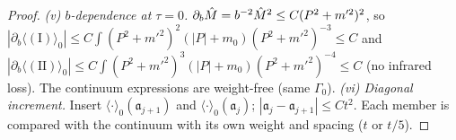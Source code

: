 \begin{proof}
\emph{(v) $b$-dependence at $\tau=0$.} $\partial_b\hat M=b^{-2}\hat M^2\le C(P^2+m'^2)^2$, so $|\partial_b\langle(\mathrm I)\rangle_0|\le C\int(P^2+m'^2)^2(|P|+m_0)(P^2+m'^2)^{-3}\le C$ and $|\partial_b\langle(\mathrm{II})\rangle_0|\le C\int(P^2+m'^2)^3(|P|+m_0)(P^2+m'^2)^{-4}\le C$ (no infrared loss). The continuum expressions are weight-free (same $\Gamma_0$).
\emph{(vi) Diagonal increment.} Insert $\langle\cdot\rangle_0(\mathfrak a_{j+1})$ and $\langle\cdot\rangle_0(\mathfrak a_j)$; $|\mathfrak a_j-\mathfrak a_{j+1}|\le Ct^2$. Each member is compared with the continuum with its own weight and spacing ($t$ or $t/5$).
\end{proof}
